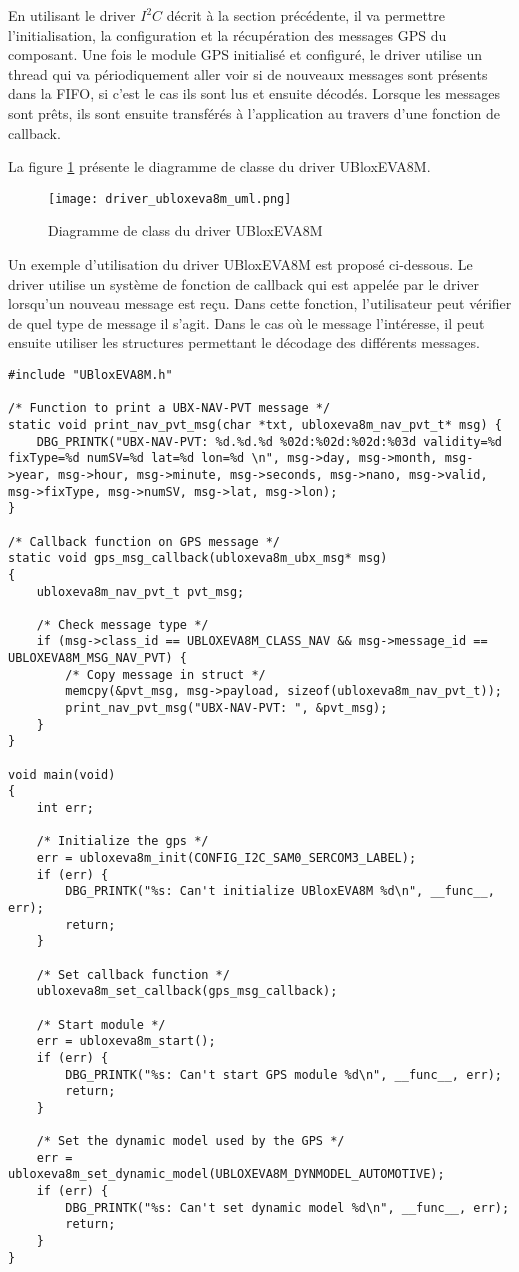En utilisant le driver $I^{2}C$ décrit à la section précédente, il va permettre l'initialisation, la configuration et la récupération des messages GPS du composant. Une fois le module GPS initialisé et configuré, le driver utilise un thread qui va périodiquement aller voir si de nouveaux messages sont présents dans la FIFO, si c'est le cas ils sont lus et ensuite décodés. Lorsque les messages sont prêts, ils sont ensuite transférés à l'application au travers d'une fonction de callback.

La figure \ref{fig:driver_ubloxeva8m_uml} présente le diagramme de classe du driver UBloxEVA8M.

\begin{figure}[htb]
\centering 
\texttt{[image: driver\_ubloxeva8m\_uml.png]} 
\caption{Diagramme de class du driver UBloxEVA8M}
\label{fig:driver_ubloxeva8m_uml}
\end{figure}

Un exemple d'utilisation du driver UBloxEVA8M est proposé ci-dessous. Le driver utilise un système de fonction de callback qui est appelée par le driver lorsqu'un nouveau message est reçu. Dans cette fonction, l'utilisateur peut vérifier de quel type de message il s'agit. Dans le cas où le message l'intéresse, il peut ensuite utiliser les structures permettant le décodage des différents messages.

\begin{lstlisting}[style=CStyle]
#include "UBloxEVA8M.h"

/* Function to print a UBX-NAV-PVT message */
static void print_nav_pvt_msg(char *txt, ubloxeva8m_nav_pvt_t* msg) {
	DBG_PRINTK("UBX-NAV-PVT: %d.%d.%d %02d:%02d:%02d:%03d validity=%d fixType=%d numSV=%d lat=%d lon=%d \n", msg->day, msg->month, msg->year, msg->hour, msg->minute, msg->seconds, msg->nano, msg->valid, msg->fixType, msg->numSV, msg->lat, msg->lon);
}

/* Callback function on GPS message */
static void gps_msg_callback(ubloxeva8m_ubx_msg* msg)
{
	ubloxeva8m_nav_pvt_t pvt_msg;
	
	/* Check message type */
	if (msg->class_id == UBLOXEVA8M_CLASS_NAV && msg->message_id == UBLOXEVA8M_MSG_NAV_PVT) {
		/* Copy message in struct */
		memcpy(&pvt_msg, msg->payload, sizeof(ubloxeva8m_nav_pvt_t));
		print_nav_pvt_msg("UBX-NAV-PVT: ", &pvt_msg);
	}
}

void main(void)
{
	int err;

	/* Initialize the gps */
	err = ubloxeva8m_init(CONFIG_I2C_SAM0_SERCOM3_LABEL);
	if (err) {
		DBG_PRINTK("%s: Can't initialize UBloxEVA8M %d\n", __func__, err);
		return;
	}

	/* Set callback function */
	ubloxeva8m_set_callback(gps_msg_callback);

	/* Start module */
	err = ubloxeva8m_start();
	if (err) {
		DBG_PRINTK("%s: Can't start GPS module %d\n", __func__, err);
		return;
	}

	/* Set the dynamic model used by the GPS */
	err = ubloxeva8m_set_dynamic_model(UBLOXEVA8M_DYNMODEL_AUTOMOTIVE);
	if (err) {
		DBG_PRINTK("%s: Can't set dynamic model %d\n", __func__, err);
		return;
	}
}
\end{lstlisting}

